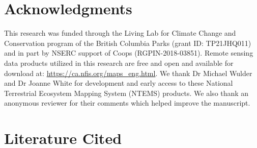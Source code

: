 \documentclass[10pt,oneside]{article}
\begin{document}
\newpage

\hypertarget{acknowledgments}{%
\section{Acknowledgments}\label{acknowledgments}}

This research was funded through the Living Lab for Climate Change and
Conservation program of the British Columbia Parks (grant ID:
TP21JHQ011) and in part by NSERC support of Coops (RGPIN-2018-03851).
Remote sensing data products utilized in this research are free and open
and available for download at: \url{https://ca.nfis.org/maps_eng.html}.
We thank Dr Michael Wulder and Dr Joanne White for development and early
access to these National Terrestrial Ecosystem Mapping System (NTEMS)
products. We also thank an anonymous reviewer for their comments which
helped improve the manuscript.

\hypertarget{literature-cited}{%
\section*{Literature Cited}\label{literature-cited}}
\end{document}
